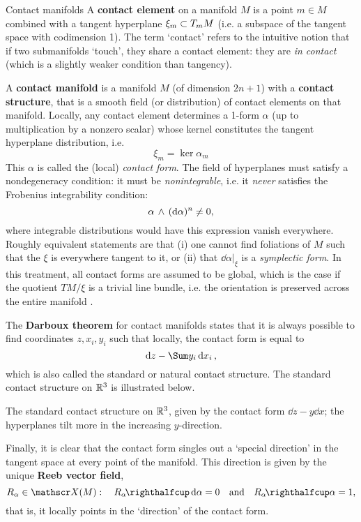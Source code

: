 \begin{mathbox}{Contact manifolds}
    A \textbf{contact element} on a manifold $M$ is a point $m \in M$ combined with a tangent hyperplane $\xi_m \subset T_mM$ (i.e. a subspace of the tangent space  with codimension 1). The term `contact' refers to the intuitive notion that if two submanifolds `touch', they share a contact element: they are \emph{in contact} (which is a slightly weaker condition than tangency). \cite{Cannas2001}

    A \textbf{contact manifold} is a manifold $M$ (of dimension $2n+1$) with a \textbf{contact structure}, that is a smooth field (or distribution) of contact elements on that manifold. Locally, any contact element determines a 1-form $\alpha$ (up to multiplication by a nonzero scalar) whose kernel constitutes the tangent hyperplane distribution, i.e. 
    $$ \xi_m = \ker \alpha_m $$
    This $\alpha$ is called the (local) \emph{contact form}. The field of hyperplanes must satisfy a nondegeneracy condition: it must be \emph{nonintegrable}, i.e. it \emph{never} satisfies the Frobenius integrability condition: \cite{Cannas2001,Abraham1978,Arnold1989}
    $$  \alpha\,\wedge\,(\dd{\alpha})^n  \neq 0, $$
    where integrable distributions would have this expression vanish everywhere. Roughly equivalent statements are that (i) one cannot find foliations of $M$ such that the $\xi$ is everywhere tangent to it, or (ii) that $\dd{\alpha}\vert_\xi$ is a \emph{symplectic form}. In this treatment, all contact forms are assumed to be global, which is the case if the quotient $TM/\xi$ is a trivial line bundle, i.e. the orientation is preserved across the entire manifold \cite{Geiges2008}.

    \tclower
    The \textbf{Darboux theorem} for contact manifolds states that it is always possible to find coordinates $z, x_i, y_i$ such that locally, the contact form is equal to 
    $$ \dd{z} - \Sum y_i\dd{x_i}, $$
    which is also called the standard or natural contact structure. The standard contact structure on $\mathbb{R}^3$ is illustrated below.
        \begin{center}
            
        \end{center}
        \begin{center}
            \begin{minipage}{12cm}
                {\small The standard contact structure on $\mathbb{R}^3$, given by the contact form $\dd{z} - y\dd{x}$; the hyperplanes tilt more in the increasing $y$-direction.}
            \end{minipage}
        \end{center}
    Finally, it is clear that the contact form singles out a `special direction' in the tangent space at every point of the manifold. This direction is given by the unique \textbf{Reeb vector field},
    $$ R_\alpha \in \vfields{M}:\quad \intpr{R_\alpha}{\dd{\alpha}}= 0 \quad \text{and} \quad \intpr{R_\alpha}{\alpha} = 1,$$
    that is, it locally points in the `direction' of the contact form.
\end{mathbox}

